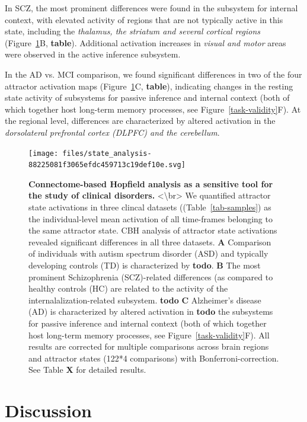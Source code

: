 \documentclass{article}
\begin{document}
In SCZ, the most prominent differences were found in the subsystem for internal context, with elevated activity of regions that are not typically active in this state, including the \textit{thalamus, the striatum and several cortical regions} (Figure~\ref{clinical-validity}B, \textbf{table}). Additional activation increases in \textit{visual and motor} areas were observed in the active inference subsystem.

In the AD vs. MCI comparison, we found significant differences in two of the four attractor activation maps (Figure~\ref{clinical-validity}C, \textbf{table}), indicating changes in the resting state activity of subsystems for passive inference and internal context (both of which together host long-term memory processes, see Figure~\ref{task-validity}F). At the regional level, differences are characterized by altered activation in the \textit{dorsolateral prefrontal cortex (DLPFC) and the cerebellum}.

\begin{figure}[!htbp]
\centering
\texttt{[image: files/state\_analysis-88225081f3065efdc459713c19def10e.svg]}
\caption[]{\textbf{Connectome-based Hopfield analysis as a sensitive tool for the study of clinical disorders.} \newline
\textless {\textbackslash}br\textgreater 
We quantified attractor state activations in three clincal datasets ((Table~\ref{tab-samples}) as the individual-level mean activation of all time-frames belonging to the same attractor state.
CBH analysis of attractor state activations revealed significant differences in all three datasets.
\textbf{A} Comparison of individuals with autism spectrum disorder (ASD) and typically developing controls (TD) is characterized by \textbf{todo}.
\textbf{B} The most prominent Schizophrenia (SCZ)-related differences (as compared to healthy controls (HC) are related to the activity of the internalalization-related subsystem. \textbf{todo}
\textbf{C} Alzheimer's disease (AD) is characterized by altered activation in \textbf{todo} the subsystems for passive inference and internal context (both of which together host long-term memory processes, see Figure~\ref{task-validity}F). All results are corrected for multiple comparisons across brain regions and attractor states (122*4 comparisons) with Bonferroni-correction. See Table \textbf{X} for detailed results.}
\label{clinical-validity}
\end{figure}

\section{Discussion}\label{Discussion}
\end{document}
